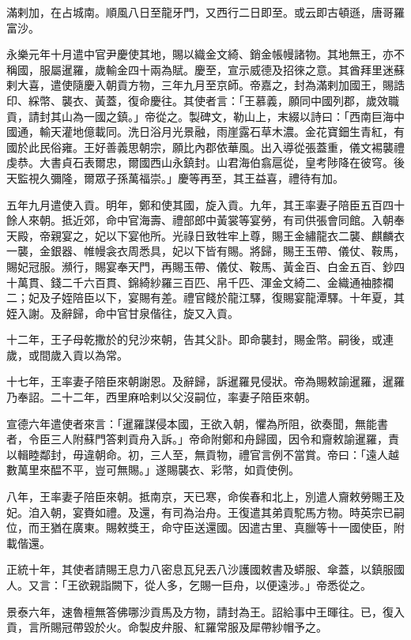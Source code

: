 \begin{pinyinscope}
滿剌加，在占城南。順風八日至龍牙門，又西行二日即至。或云即古頓遜，唐哥羅富沙。

永樂元年十月遣中官尹慶使其地，賜以織金文綺、銷金帳幔諸物。其地無王，亦不稱國，服屬暹羅，歲輸金四十兩為賦。慶至，宣示威德及招徠之意。其酋拜里迷蘇剌大喜，遣使隨慶入朝貢方物，三年九月至京師。帝嘉之，封為滿剌加國王，賜誥印、綵幣、襲衣、黃蓋，復命慶往。其使者言：「王慕義，願同中國列郡，歲效職貢，請封其山為一國之鎮。」帝從之。製碑文，勒山上，末綴以詩曰：「西南巨海中國通，輸天灌地億載同。洗日浴月光景融，雨崖露石草木濃。金花寶鈿生青紅，有國於此民俗雍。王好善義思朝宗，願比內郡依華風。出入導從張蓋重，儀文裼襲禮虔恭。大書貞石表爾忠，爾國西山永鎮封。山君海伯翕扈從，皇考陟降在彼穹。後天監視久彌隆，爾眾子孫萬福崇。」慶等再至，其王益喜，禮待有加。

五年九月遣使入貢。明年，鄭和使其國，旋入貢。九年，其王率妻子陪臣五百四十餘人來朝。抵近郊，命中官海壽、禮部郎中黃裳等宴勞，有司供張會同館。入朝奉天殿，帝親宴之，妃以下宴他所。光祿日致牲牢上尊，賜王金繡龍衣二襲、麒麟衣一襲，金銀器、帷幔衾衣周悉具，妃以下皆有賜。將歸，賜王玉帶、儀仗、鞍馬，賜妃冠服。瀕行，賜宴奉天門，再賜玉帶、儀仗、鞍馬、黃金百、白金五百、鈔四十萬貫、錢二千六百貫、錦綺紗羅三百匹、帛千匹、渾金文綺二、金織通袖膝襴二；妃及子姪陪臣以下，宴賜有差。禮官餞於龍江驛，復賜宴龍潭驛。十年夏，其姪入謝。及辭歸，命中官甘泉偕往，旋又入貢。

十二年，王子母乾撒於的兒沙來朝，告其父訃。即命襲封，賜金幣。嗣後，或連歲，或間歲入貢以為常。

十七年，王率妻子陪臣來朝謝恩。及辭歸，訴暹羅見侵狀。帝為賜敕諭暹羅，暹羅乃奉詔。二十二年，西里麻哈剌以父沒嗣位，率妻子陪臣來朝。

宣德六年遣使者來言：「暹羅謀侵本國，王欲入朝，懼為所阻，欲奏聞，無能書者，令臣三人附蘇門答剌貢舟入訴。」帝命附鄭和舟歸國，因令和齎敕諭暹羅，責以輯睦鄰封，毋違朝命。初，三人至，無貢物，禮官言例不當賞。帝曰：「遠人越數萬里來醖不平，豈可無賜。」遂賜襲衣、彩幣，如貢使例。

八年，王率妻子陪臣來朝。抵南京，天已寒，命俟春和北上，別遣人齎敕勞賜王及妃。洎入朝，宴賚如禮。及還，有司為治舟。王復遣其弟貢駝馬方物。時英宗已嗣位，而王猶在廣東。賜敕獎王，命守臣送還國。因遣古里、真臘等十一國使臣，附載偕還。

正統十年，其使者請賜王息力八密息瓦兒丟八沙護國敕書及蟒服、傘蓋，以鎮服國人。又言：「王欲親詣闕下，從人多，乞賜一巨舟，以便遠涉。」帝悉從之。

景泰六年，速魯檀無答佛哪沙貢馬及方物，請封為王。詔給事中王暉往。已，復入貢，言所賜冠帶毀於火。命製皮弁服、紅羅常服及犀帶紗帽予之。


\end{pinyinscope}

